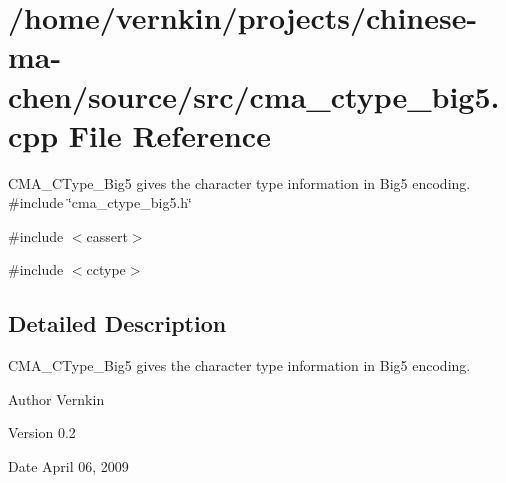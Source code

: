 \section{/home/vernkin/projects/chinese-\/ma-\/chen/source/src/cma\_\-ctype\_\-big5.cpp File Reference}
\label{cma__ctype__big5_8cpp}


CMA\_\-CType\_\-Big5 gives the character type information in Big5 encoding.  
{\ttfamily \#include \char`\"{}cma\_\-ctype\_\-big5.h\char`\"{}}\par
{\ttfamily \#include $<$cassert$>$}\par
{\ttfamily \#include $<$cctype$>$}\par


\subsection{Detailed Description}
CMA\_\-CType\_\-Big5 gives the character type information in Big5 encoding. \begin{DoxyAuthor}{Author}
Vernkin 
\end{DoxyAuthor}
\begin{DoxyVersion}{Version}
0.2 
\end{DoxyVersion}
\begin{DoxyDate}{Date}
April 06, 2009 
\end{DoxyDate}
